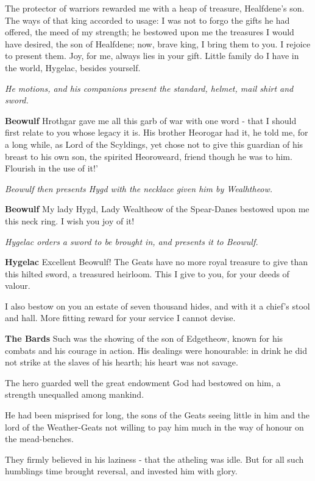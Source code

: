 \documentclass[a4paper]{article}
\begin{document}
{The protector of warriors rewarded me
with a heap of treasure, Healfdene's son.
The ways of that king accorded to usage:
I was not to forgo the gifts he had offered,
the meed of my strength; he bestowed upon me
the treasures I would have desired, the son of Healfdene;
now, brave king, I bring them to you.
I rejoice to present them. Joy, for me, always
lies in your gift. Little family
do I have in the world, Hygelac, besides yourself.

\centerline{\textit{He motions, and his companions present the standard, helmet, mail shirt and sword.}}

\textbf{Beowulf} Hrothgar gave me all this garb of war
with one word - that I should first relate to you whose legacy it is.
His brother Heorogar had it, he told me,
for a long while, as Lord of the Scyldings,
yet chose not to give this guardian of his breast
to his own son, the spirited Heoroweard,
friend though he was to him.
Flourish in the use of it!'

\centerline{\textit{Beowulf then presents Hygd with the necklace given him by Wealhtheow.}}

\textbf{Beowulf} My lady Hygd,
Lady Wealtheow of the Spear-Danes 
bestowed upon me this neck ring. 
I wish you joy of it!

\newpage
\centerline{\textit{Hygelac orders a sword to be brought in, and presents it to Beowulf.}}

\textbf{Hygelac} Excellent Beowulf!
The Geats have no more royal treasure to give
than this hilted sword, a treasured heirloom.
This I give to you, for your deeds of valour.

I also bestow on you an estate of seven thousand hides,
and with it a chief's stool and hall. 
More fitting reward for your service I cannot devise.

\textbf{The Bards} Such was the showing of the son of Edgetheow,
known for his combats and his courage in action.
His dealings were honourable: in drink he did not strike
at the slaves of his hearth; his heart was not savage.

The hero guarded well the great endowment
God had bestowed on him, a strength unequalled
among mankind. 

He had been misprised for long,
the sons of the Geats seeing little in him
and the lord of the Weather-Geats not willing to pay him
much in the way of honour on the mead-benches.

They firmly believed in his laziness - 
that the atheling was idle.
But for all such humblings
time brought reversal, and invested him with glory.

}
\end{document}
